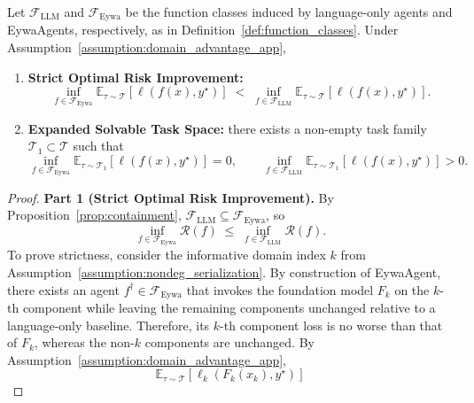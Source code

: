 \documentclass{llmxive}
\begin{document}
{\begin{theorem}
\label{thm:eywaagent_improvement_app}
Let $\mathcal{F}_{\mathrm{LLM}}$ and $\mathcal{F}_{\mathrm{Eywa}}$ be the function classes induced by language-only agents and EywaAgents, respectively, as in Definition~\ref{def:function_classes}. Under Assumption~\ref{assumption:domain_advantage_app},
\begin{enumerate}
    \item \textbf{Strict Optimal Risk Improvement:}
    \begin{equation}
    \inf_{f\in\mathcal{F}_{\mathrm{Eywa}}}\mathbb{E}_{\tau\sim\mathcal{T}}[\ell(f(x),y^\star)]
    \;<\;
    \inf_{f\in\mathcal{F}_{\mathrm{LLM}}}\mathbb{E}_{\tau\sim\mathcal{T}}[\ell(f(x),y^\star)].
    \end{equation}
    \item \textbf{Expanded Solvable Task Space:} there exists a non-empty task family $\mathcal{T}_1\subset\mathcal{T}$ such that
    \begin{equation}
    \inf_{f\in\mathcal{F}_{\mathrm{Eywa}}}\mathbb{E}_{\tau\sim\mathcal{T}_1}[\ell(f(x),y^\star)] = 0,
    \qquad
    \inf_{f\in\mathcal{F}_{\mathrm{LLM}}}\mathbb{E}_{\tau\sim\mathcal{T}_1}[\ell(f(x),y^\star)] > 0.
    \end{equation}
\end{enumerate}
\end{theorem}
\begin{proof}
\textbf{Part 1 (Strict Optimal Risk Improvement).} By Proposition~\ref{prop:containment}, $\mathcal{F}_{\mathrm{LLM}}\subseteq\mathcal{F}_{\mathrm{Eywa}}$, so
\begin{equation}
\label{eq:inf_eywa_inf_llm}
\inf_{f\in\mathcal{F}_{\mathrm{Eywa}}}\mathcal{R}(f)\;\le\;\inf_{f\in\mathcal{F}_{\mathrm{LLM}}}\mathcal{R}(f). 
\end{equation}
To prove strictness, consider the informative domain index $k$ from Assumption~\ref{assumption:nondeg_serialization}. By construction of EywaAgent, there exists an agent $f^\dagger\in\mathcal{F}_{\mathrm{Eywa}}$ that invokes the foundation model $F_k$ on the $k$-th component while leaving the remaining components unchanged relative to a language-only baseline. Therefore, its $k$-th component loss is no worse than that of $F_k$, whereas the non-$k$ components are unchanged.
By Assumption~\ref{assumption:domain_advantage_app},
\begin{equation}
\mathbb{E}_{\tau\sim\mathcal{T}}[\ell_k(F_k(x_k),y^\star)]

\end{equation}
\end{proof}}
\end{document}
